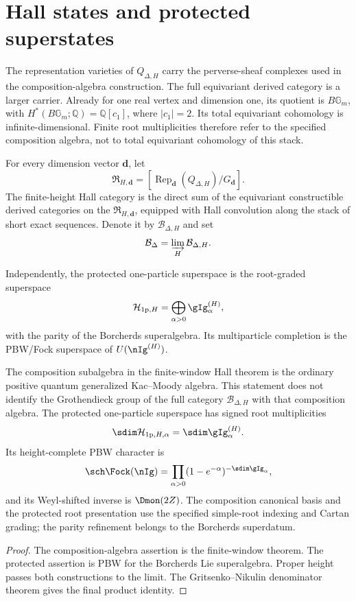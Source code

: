 \chapter{Hall states and protected superstates}
The representation varieties of $Q_{\Delta,H}$ carry the
perverse-sheaf complexes used in the composition-algebra construction.
The full equivariant derived category is a larger carrier.
Already for one real vertex and dimension one, its quotient is
$B\mathbb G_m$, with $H^*(B\mathbb G_m;\mathbb Q)=\mathbb Q[c_1]$,
where $|c_1|=2$. Its total equivariant cohomology is infinite-dimensional.
Finite root multiplicities therefore refer to the specified composition
algebra, not to total equivariant cohomology of this stack.

\begin{definition}
For every dimension vector $\mathbf d$, let
\[
 \mathfrak R_{H,\mathbf d}=
 [\operatorname{Rep}_{\mathbf d}(Q_{\Delta,H})/G_{\mathbf d}].
\]
The finite-height Hall category is the direct sum of the equivariant constructible derived categories on the $\mathfrak R_{H,\mathbf d}$, equipped with Hall convolution along the stack of short exact sequences.  Denote it by $\mathcal B_{\Delta,H}$ and set
\[
 \mathcal B_\Delta=\varinjlim_H\mathcal B_{\Delta,H}.
\]
\end{definition}

Independently, the protected one-particle superspace is the root-graded superspace
\[
 \mathcal H_{\mathrm{1p},H}
 =\bigoplus_{\alpha>0}\gIg^{(H)}_\alpha,
\]
with the parity of the Borcherds superalgebra.  Its multiparticle completion is the PBW/Fock superspace of $U(\nIg^{(H)})$.

\begin{theorem}
The composition subalgebra in the finite-window Hall theorem
is the ordinary positive quantum generalized Kac--Moody algebra.
This statement does not identify the Grothendieck group of the full
category $\mathcal B_{\Delta,H}$ with that composition algebra.  The protected one-particle superspace has signed root multiplicities
\[
 \sdim\mathcal H_{\mathrm{1p},H,\alpha}
 =\sdim\gIg^{(H)}_\alpha.
\]
Its height-complete PBW character is
\[
 \sch\Fock(\nIg)
 =\prod_{\alpha>0}(1-e^{-\alpha})^{-\sdim\gIg_\alpha},
\]
and its Weyl-shifted inverse is $\Dmon(2Z)$.  The composition canonical basis and the protected root presentation use the specified simple-root indexing and Cartan grading; the parity refinement belongs to the Borcherds superdatum.
\end{theorem}
\begin{proof}
The composition-algebra assertion is the finite-window theorem. The protected assertion is PBW for the Borcherds Lie superalgebra.  Proper height passes both constructions to the limit.  The Gritsenko--Nikulin denominator theorem gives the final product identity.
\end{proof}

